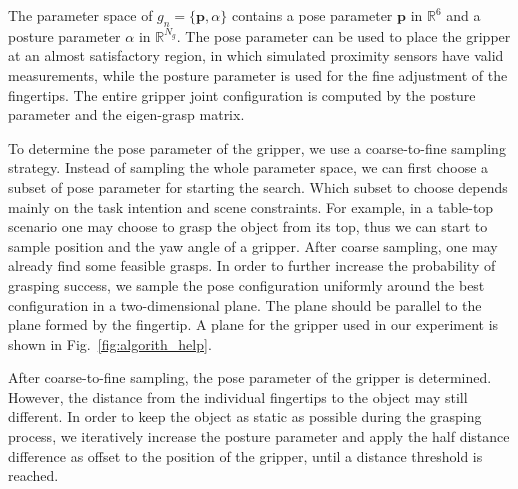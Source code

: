 The parameter space of $g_n = \lbrace \bm{p}, {\alpha} \rbrace $ contains a pose parameter $\bm{p}$ in $\mathbb{R}^6$ and a posture parameter ${\alpha}$ in $\mathbb{R}^{N_g}$. The pose parameter can be used to place the gripper at an almost satisfactory region, in which simulated proximity sensors have valid measurements, while the posture parameter is used for the fine adjustment of the fingertips. The entire gripper joint configuration is computed by the posture parameter and the eigen-grasp matrix. 

To determine the pose parameter of the gripper, we use a coarse-to-fine sampling strategy. Instead of sampling the whole parameter space, we can first choose a subset of pose parameter for starting the search. Which subset to choose depends mainly on the task intention and scene constraints. For example, in a table-top scenario one may choose to grasp the object from its top, thus we can start to sample position and the yaw angle of a gripper. After coarse sampling, one may already find some feasible grasps. In order to further increase the probability of grasping success, we sample the pose configuration uniformly around the best configuration in a two-dimensional plane. The plane should be parallel to the plane formed by the fingertip. A plane for the gripper used in our experiment is shown in Fig.~\ref{fig:algorith_help}.

After coarse-to-fine sampling, the pose parameter of the gripper is determined. However, the distance from the individual fingertips to the object may still different. In order to keep the object as static as possible during the grasping process, we iteratively increase the posture parameter and apply the half distance difference as offset to the position of the gripper, until a distance threshold is reached.  
 
